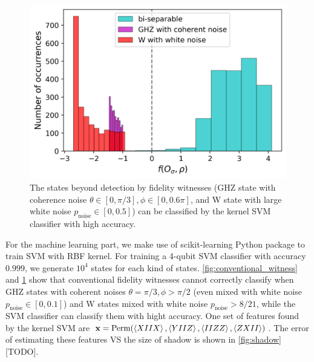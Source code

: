 \documentclass[
aps,
pra,
twocolumn,
floatfix,
]{revtex4-2}
\theoremstyle{plain}
\theoremstyle{definition}
\newcommand{\perm}{\textup{Perm}}
\newcommand{\noise}{\text{noise}}
\begin{document}
\begin{figure}[!ht]
	\centering
		\includegraphics[width=.9\linewidth]{./Code/three_qubit_hist_ML.png}
	\caption{The states beyond detection by fidelity witnesses (GHZ state with coherence noise $\theta\in[0,\pi/3], \phi\in[0,0.6\pi]$, and W state with large white noise $p_{\noise}\in[0,0.5]$) can be classified by the kernel SVM classifier with high accuracy.}
	\label{fig:ml_compare}
\end{figure}
For the machine learning part, we make use of scikit-learning Python package \cite{pedregosaScikitlearnMachineLearning2011} to train SVM with RBF kernel.
For training a 4-qubit SVM classifier with accuracy $0.999$, we generate $10^4$ states for each kind of states.
\cref{fig:conventional_witness} and \cref{fig:ml_compare} show that conventional fidelity witnesses cannot correctly classify when GHZ states with coherent noises $\theta=\pi/3,\phi>\pi/2$ (even mixed with white noise $p_\noise \in [0,0.1]$) and W states mixed with white noise $p_{\noise}>8/21$,
while the SVM classifier can classify them with hight accuracy.
One set of features found by the kernel SVM are 
$\vbx=\perm(\expval{XIIX},\expval{YIIZ},\expval{IIZZ},\expval{ZXII})$.
The error of estimating these features VS the size of shadow is shown in \cref{fig:shadow} [TODO].
\end{document}
